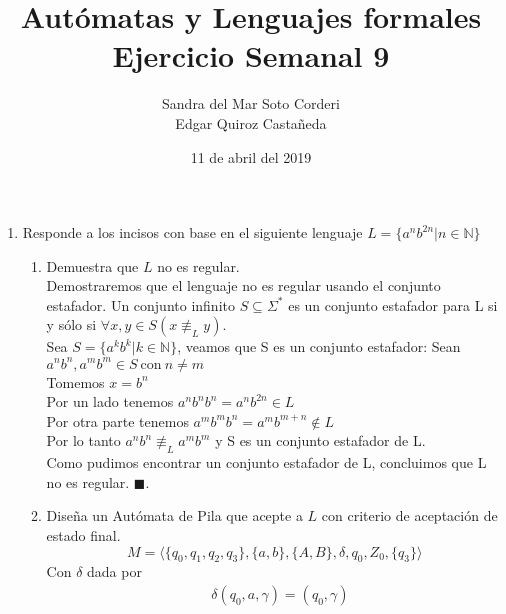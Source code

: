 \documentclass{article}
\begin{document}
    \title{
        Autómatas y Lenguajes formales \\
        Ejercicio Semanal 9
    }

    \author{
        Sandra del Mar Soto Corderi \\
        Edgar Quiroz Castañeda
    }

    \date{
        11 de abril del 2019
    }
    
    \maketitle

    \begin{enumerate}
        \item {
        Responde a los incisos con base en el siguiente lenguaje $L = 
        \{a^nb^{2n} | n \in \mathbb{N}\}$
        \begin{enumerate}
        	\item {
        	Demuestra que $L$ no es regular.\\
            Demostraremos que el lenguaje no es regular usando el conjunto 
            estafador.
            Un conjunto infinito $S \subseteq \Sigma^*$ es un conjunto estafador
            para L si y sólo si $\forall x,y \in S (x \not\equiv_L y)$.\\
            Sea $S = \{ a^kb^k | k \in \mathbb{N}\}$, veamos que S es un 
            conjunto estafador: Sean $a^nb^n , a^mb^m \in S \ \text{con} \ n 
            \neq m$\\
        	Tomemos $x = b^n$\\
        	Por un lado tenemos $ a^nb^nb^n = a^nb^{2n} \in L$\\
        	Por otra parte tenemos $a^mb^mb^n = a^mb^{m + n} \not \in L$\\
            Por lo tanto $a^nb^n \not\equiv_L a^mb^m$ y S es un conjunto 
            estafador de L.\\
            Como pudimos encontrar un conjunto estafador de L, concluimos que 
            L no es regular. $\blacksquare$.
        	}
        	\item{
            Diseña un Autómata de Pila que acepte a $L$ con criterio de 
            aceptación de estado final.
            \[M = \langle \{q_{0}, q_{1}, q_{2}, q_{3}\}, \{a, b\}, \{A, B\},
            \delta, q_{0}, Z_{0}, \{q_{3}\}\rangle\]
            Con $\delta$ dada por
            \begin{align*}
                &\delta(q_{0}, a, \gamma) = (q_{0}, \gamma) \\

\end{align*}}
\end{enumerate}}
\end{enumerate}
\end{document}
